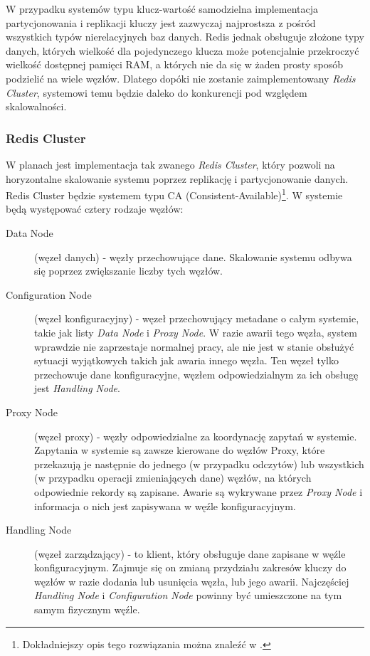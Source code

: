 W przypadku systemów typu klucz-wartość samodzielna implementacja partycjonowania i replikacji kluczy jest zazwyczaj najprostsza z pośród wszystkich typów nierelacyjnych baz danych.
Redis jednak obsługuje złożone typy danych, których wielkość dla pojedynczego klucza może potencjalnie przekroczyć wielkość dostępnej pamięci RAM, a których nie da się w żaden prosty sposób podzielić na wiele węzłów.
Dlatego dopóki nie zostanie zaimplementowany \emph{Redis Cluster}, systemowi temu będzie daleko do konkurencji pod względem skalowalności.

\subsubsection*{Redis Cluster}
\label{sec:redis-cluster}

W planach jest implementacja tak zwanego \emph{Redis Cluster}, który pozwoli na horyzontalne skalowanie systemu poprzez replikację i partycjonowanie danych.
Redis Cluster będzie systemem typu CA (Consistent-Available)\footnote{Dokładniejszy opis tego rozwiązania można znaleźć w \cite{antirez-redis-cluster}.}.
W systemie będą występować cztery rodzaje węzłów:

\begin{description}
 \item[Data Node] (węzeł danych) - węzły przechowujące dane.
 Skalowanie systemu odbywa się poprzez zwiększanie liczby tych węzłów.

 \item[Configuration Node] (węzeł konfiguracyjny) - węzeł przechowujący metadane o całym systemie, takie jak listy \emph{Data Node} i \emph{Proxy Node}.
 W razie awarii tego węzła, system wprawdzie nie zaprzestaje normalnej pracy, ale nie jest w stanie obsłużyć sytuacji wyjątkowych takich jak awaria innego węzła.
 Ten węzeł tylko przechowuje dane konfiguracyjne, węzłem odpowiedzialnym za ich obsługę jest \emph{Handling Node}.

 \item[Proxy Node] (węzeł proxy) - węzły odpowiedzialne za koordynację zapytań w systemie.
 Zapytania w systemie są zawsze kierowane do węzłów Proxy, które przekazują je następnie do jednego (w przypadku odczytów) lub wszystkich (w przypadku operacji zmieniających dane) węzłów, na których odpowiednie rekordy są zapisane.
 Awarie są wykrywane przez \emph{Proxy Node} i informacja o nich jest zapisywana w węźle konfiguracyjnym.

 \item[Handling Node] (węzeł zarządzający) - to klient, który obsługuje dane zapisane w węźle konfiguracyjnym.
 Zajmuje się on zmianą przydziału zakresów kluczy do węzłów w razie dodania lub usunięcia węzła, lub jego awarii.
 Najczęściej \emph{Handling Node} i \emph{Configuration Node} powinny być umieszczone na tym samym fizycznym węźle.
\end{description}

